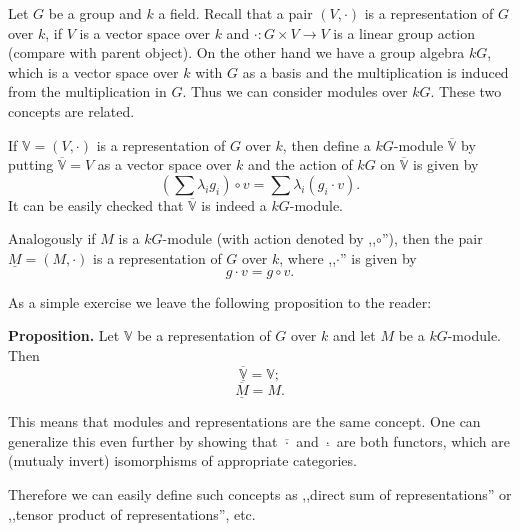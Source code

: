 \documentclass[12pt]{article}
\begin{document}
Let $G$ be a group and $k$ a field. Recall that a pair $(V, \cdot)$ is a representation of $G$ over $k$, if $V$ is a vector space over $k$ and $\cdot:G\times V\to V$ is a linear group action (compare with parent object). On the other hand we have a group algebra $kG$, which is a vector space over $k$ with $G$ as a basis and the multiplication is induced from the multiplication in $G$. Thus we can consider modules over $kG$. These two concepts are related.

If $\mathbb{V}=(V,\cdot)$ is a representation of $G$ over $k$, then define a $kG$-module $\overline{\mathbb{V}}$ by putting $\overline{\mathbb{V}}=V$ as a vector space over $k$ and the action of $kG$ on $\overline{\mathbb{V}}$ is given by
$$(\sum \lambda_ig_i)\circ v = \sum \lambda_i(g_i\cdot v).$$
It can be easily checked that $\overline{\mathbb{V}}$ is indeed a $kG$-module.

Analogously if $M$ is a $kG$-module (with action denoted by ,,$\circ$''), then the pair $\underline{M}=(M,\cdot)$ is a representation of $G$ over $k$, where ,,$\cdot$'' is given by
$$g\cdot v =g\circ v.$$

As a simple exercise we leave the following proposition to the reader:

\textbf{Proposition.} Let $\mathbb{V}$ be a representation of $G$ over $k$ and let $M$ be a $kG$-module. Then
$$\underline{\overline{\mathbb{V}}}=\mathbb{V};$$
$$\overline{\underline{M}}=M.$$

This means that modules and representations are the same concept. One can generalize this even further by showing that $\overline{\cdot}$ and $\underline{\cdot}$ are both functors, which are (mutualy invert) isomorphisms of appropriate categories.

Therefore we can easily define such concepts as ,,direct sum of representations'' or ,,tensor product of representations'', etc.
\end{document}
